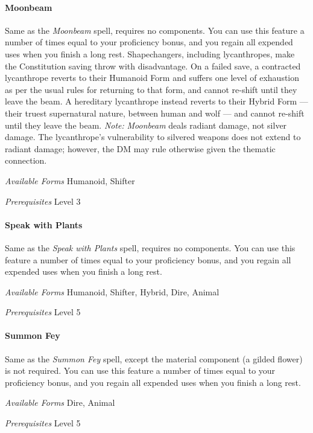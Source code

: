 \documentclass[twocolumn]{dndbook}
\begin{document}
\paragraph*{Moonbeam}
Same as the \emph{Moonbeam} spell, requires no components.
You can use this feature a number of times equal to your proficiency bonus, and you regain all expended uses when you finish a long rest.
Shapechangers, including lycanthropes, make the Constitution saving throw with disadvantage.
On a failed save, a contracted lycanthrope reverts to their Humanoid Form and suffers one level of exhaustion as per the usual rules for returning to that form, and cannot re-shift until they leave the beam.
A hereditary lycanthrope instead reverts to their Hybrid Form --- their truest supernatural nature, between human and wolf --- and cannot re-shift until they leave the beam.
\emph{Note:} \emph{Moonbeam} deals radiant damage, not silver damage. The lycanthrope's vulnerability to silvered weapons does not extend to radiant damage; however, the DM may rule otherwise given the thematic connection.\par
\emph{Available Forms} Humanoid, Shifter\par
\emph{Prerequisites} Level 3\par

\paragraph*{Speak with Plants}
Same as the \emph{Speak with Plants} spell, requires no components.
You can use this feature a number of times equal to your proficiency bonus, and you regain all expended uses when you finish a long rest.\par
\emph{Available Forms} Humanoid, Shifter, Hybrid, Dire, Animal\par
\emph{Prerequisites} Level 5\par

\paragraph*{Summon Fey}
Same as the \emph{Summon Fey} spell, except the material component (a gilded flower) is not required.
You can use this feature a number of times equal to your proficiency bonus, and you regain all expended uses when you finish a long rest.\par
\emph{Available Forms} Dire, Animal\par
\emph{Prerequisites} Level 5\par
\end{document}
